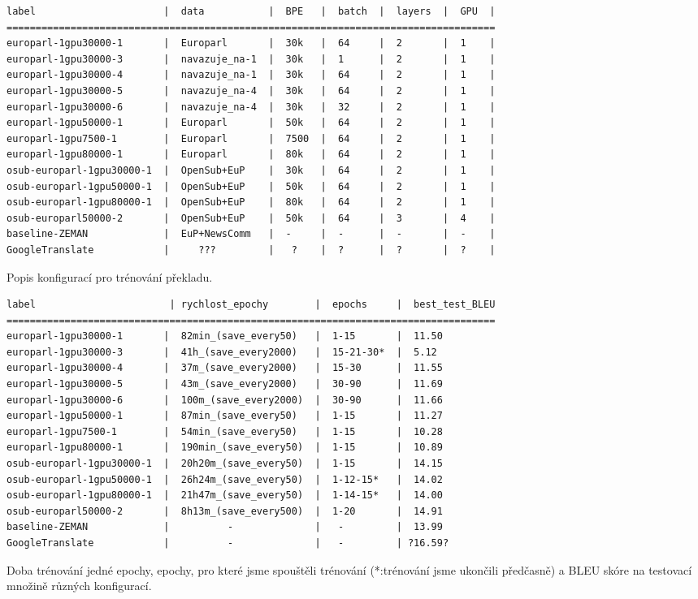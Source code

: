 \documentclass[a4]{article}
\begin{document}
\begin{table}[htpb]
\begin{verbatim}
label                      |  data           |  BPE   |  batch  |  layers  |  GPU  |  
====================================================================================
europarl-1gpu30000-1       |  Europarl       |  30k   |  64     |  2       |  1    |  
europarl-1gpu30000-3       |  navazuje_na-1  |  30k   |  1      |  2       |  1    |  
europarl-1gpu30000-4       |  navazuje_na-1  |  30k   |  64     |  2       |  1    |  
europarl-1gpu30000-5       |  navazuje_na-4  |  30k   |  64     |  2       |  1    |  
europarl-1gpu30000-6       |  navazuje_na-4  |  30k   |  32     |  2       |  1    |  
europarl-1gpu50000-1       |  Europarl       |  50k   |  64     |  2       |  1    |  
europarl-1gpu7500-1        |  Europarl       |  7500  |  64     |  2       |  1    |  
europarl-1gpu80000-1       |  Europarl       |  80k   |  64     |  2       |  1    |  
osub-europarl-1gpu30000-1  |  OpenSub+EuP    |  30k   |  64     |  2       |  1    |  
osub-europarl-1gpu50000-1  |  OpenSub+EuP    |  50k   |  64     |  2       |  1    |  
osub-europarl-1gpu80000-1  |  OpenSub+EuP    |  80k   |  64     |  2       |  1    |  
osub-europarl50000-2       |  OpenSub+EuP    |  50k   |  64     |  3       |  4    |  
baseline-ZEMAN             |  EuP+NewsComm   |  -     |  -      |  -       |  -    |
GoogleTranslate            |     ???         |   ?    |  ?      |  ?       |  ?    |
\end{verbatim}
\caption{Popis konfigurací pro trénování překladu.}
\label{tab:config}
%
%
%
%
\begin{verbatim}
label                       | rychlost_epochy        |  epochs     |  best_test_BLEU
====================================================================================
europarl-1gpu30000-1       |  82min_(save_every50)   |  1-15       |  11.50
europarl-1gpu30000-3       |  41h_(save_every2000)   |  15-21-30*  |  5.12
europarl-1gpu30000-4       |  37m_(save_every2000)   |  15-30      |  11.55
europarl-1gpu30000-5       |  43m_(save_every2000)   |  30-90      |  11.69
europarl-1gpu30000-6       |  100m_(save_every2000)  |  30-90      |  11.66
europarl-1gpu50000-1       |  87min_(save_every50)   |  1-15       |  11.27
europarl-1gpu7500-1        |  54min_(save_every50)   |  1-15       |  10.28
europarl-1gpu80000-1       |  190min_(save_every50)  |  1-15       |  10.89
osub-europarl-1gpu30000-1  |  20h20m_(save_every50)  |  1-15       |  14.15
osub-europarl-1gpu50000-1  |  26h24m_(save_every50)  |  1-12-15*   |  14.02
osub-europarl-1gpu80000-1  |  21h47m_(save_every50)  |  1-14-15*   |  14.00
osub-europarl50000-2       |  8h13m_(save_every500)  |  1-20       |  14.91
baseline-ZEMAN             |          -              |   -         |  13.99
GoogleTranslate            |          -              |   -         | ?16.59?
\end{verbatim}
\caption{Doba trénování jedné epochy, epochy, pro které jsme spouštěli
trénování (*:trénování jsme ukončili předčasně) a BLEU skóre na testovací množině různých konfigurací.}
\label{tab:results}
\end{table}
\end{document}
